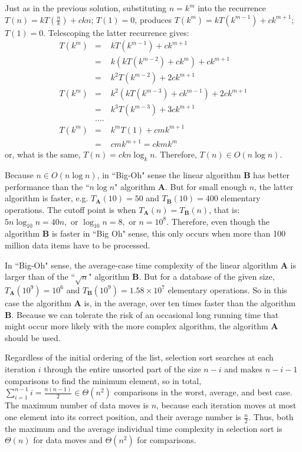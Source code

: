 {}%
Just as in the previous solution, substituting \(n=k^m\) into the recurrence 
\(T(n) =kT(\frac{n}{k})+ckn\); \(T(1)=0\),
produces \(T(k^m) = kT(k^{m-1})+ck^{m+1}\); \(T(1)=0\).
Telescoping the latter recurrence gives:
\begin{eqnarray*}
T(k^m) &=& kT(k^{m-1}) + ck^{m+1} \\
             &=& k\left(kT(k^{m-2})+ ck^m\right) + ck^{m+1} \\
             &=&k^2T(k^{m-2}) + 2ck^{m+1} \\
T(k^m) &=& k^2\left(kT(k^{m-3})+ck^{m-1}\right) + 2ck^{m+1}\\
             &=& k^3T(k^{m-3}) + 3ck^{m+1}\\
             &.\ldots& \\
T(k^m) &=& k^mT(1) + cmk^{m+1} \\
              &=& cmk^{m+1} = ckmk^m
\end{eqnarray*}
or, what is the same, \(T(n) = ckn\log_k{n}\).
Therefore, \(T(n) \in O(n\log{n})\).

Because \(n \in O(n\log{n})\), in ``Big-Oh" sense the linear algorithm \textbf{B} 
has better performance than the ``\(n\log{n}\)" algorithm \textbf{A}. But for 
small enough \(n\), the latter algorithm is faster,
e.g. $T_\mathbf{A}(10) = 50$ and $T_\mathbf{B}(10)=400$ elementary operations. The cutoff point is when 
\(T_{\textbf{A}}(n) = T_{\textbf{B}}(n)\), that is:
\(
5n\log_{10}n = 40n,\textrm{  or  }\log_{10}n = 8,\textrm{  or  }n = 10^8
\).
Therefore, even though the algorithm \textbf{B} is faster in ``Big Oh" sense, 
this only occurs when more than 100 million data items have to be processed. 

In ``Big-Oh" sense, the average-case time complexity of the 
linear algorithm \textbf{A} is larger than of the ``$\sqrt{n}$" algorithm \textbf{B}. 
But for a database of the given size, $T_{\mathbf{A}}(10^9) = 10^6$ and 
$T_{\mathbf{B}}(10^9) = 1.58 \times 10^7$ elementary operations. So in this case the 
algorithm \textbf{A} is, in the average,
over ten times faster than the algorithm \textbf{B}. Because we can tolerate the risk of an
occasional long running time that might occur more likely with the more complex 
algorithm, the algorithm \textbf{A} should be used.

Regardless of the initial ordering of the list, selection sort searches at each iteration $i$ through the entire unsorted part
of the size $n-i$ and makes $n-i-1$ comparisons to find the minimum element, so in total, 
\(\sum_{i=1}^{n-1}{i}= \frac{n(n-1)}{2} \in \Theta(n^2)\) comparisons in the worst, average, and best case.
The maximum number of data moves is \(n\), because each iteration moves at most one element into its 
correct position, and their average number is \(\frac{n}{2}\). 
Thus, both the maximum and the average individual time complexity in selection 
sort is $\Theta(n)$ for data moves and \(\Theta(n^2)\) for comparisons.

